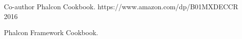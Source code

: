 
\begin{cventries}

  \cventry
    {Co-author}
    {Phalcon Cookbook.}
    {https://www.amazon.com/dp/B01MXDECCR}
    {2016}
    {
      \begin{cvitems}
        \item {Phalcon Framework Cookbook.}
      \end{cvitems}
    }

\end{cventries}
